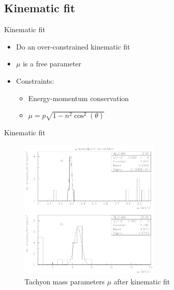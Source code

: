 \documentclass{beamer}
\begin{document}
\subsection{Kinematic fit}
\begin{frame}{Kinematic fit}
  \begin{itemize}
    \setlength\itemsep{2.0em}
    \item{Do an over-constrained kinematic fit}
    \item{$\mu$ is a free parameter}
    \item{Constraints:}
    \begin{itemize}
      \setlength\itemsep{0.5em}
      \item{Energy-momentum conservation}
      \item{$\mu = p\sqrt{1 - n^2\cos^2(\theta)}$}
    \end{itemize}
  \end{itemize}
\end{frame}

\begin{frame}{Kinematic fit}
  \begin{figure}
    \centering
    \includegraphics[width = 0.6\textwidth]{ConstrainedMassParameters.png}
    \caption{Tachyon mass parameters $\mu$ after kinematic fit}
  \end{figure}
\end{frame}
\end{document}
